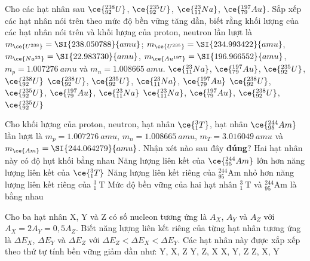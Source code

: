 \begin{ex}
	Cho các hạt nhân sau $\ce{_{92}^{238}U}$, $\ce{_{92}^{235}U}$, $\ce{_{11}^{23}Na}$, $\ce{_{79}^{197}Au}$. Sắp xếp các hạt nhân nói trên theo mức độ bền vững tăng dần, biết rằng khối lượng của các hạt nhân nói trên và khối lượng của proton, neutron lần lượt là $m_{\ce{U^{238}}}=\SI{238.050788}{amu}$; $m_{\ce{U^{235}}}=\SI{234.993422}{amu}$, $m_{\ce{Na^{23}}}=\SI{22.983730}{amu}$, $m_{\ce{Au^{197}}}=\SI{196.966552}{amu}$, $m_{p}=\SI{1.007276}{amu}$ và $m_{n}=\SI{1.008665}{amu}$.
	\choice
	{$\ce{_{11}^{23}Na}$, $\ce{_{79}^{197}Au}$, $\ce{_{92}^{235}U}$, $\ce{_{92}^{238}U}$}
	{$\ce{_{92}^{238}U}$, $\ce{_{92}^{235}U}$, $\ce{_{11}^{23}Na}$, $\ce{_{79}^{197}Au}$}
	{\True $\ce{_{92}^{238}U}$, $\ce{_{92}^{235}U}$, $\ce{_{79}^{197}Au}$, $\ce{_{11}^{23}Na}$}
	{$\ce{_{11}^{23}Na}$, $\ce{_{79}^{197}Au}$, $\ce{_{92}^{238}U}$, $\ce{_{92}^{235}U}$}
\end{ex}
\begin{ex}
	Cho khối lượng của proton, neutron, hạt nhân $\ce{_1^3T}$, hạt nhân $\ce{_{95}^{244}Am}$ lần lượt là $m_{p}=\SI{1.007276}{amu}$,  $m_{n}=\SI{1.008665}{amu}$, $m_{T}=\SI{3.016049}{amu}$ và $m_{\ce{Am}}=\SI{244.064279}{amu}$. Nhận xét nào sau đây \textbf{đúng}?
	\choice
	{Hai hạt nhân này có độ hụt khối bằng nhau}
	{\True Năng lượng liên kết của $\ce{_{95}^{244}Am}$ lớn hơn năng lượng liên kết của $\ce{_1^3T}$}
	{Năng lượng liên kết riêng của ${ }_{95}^{244} \mathrm{Am}$ nhỏ hơn năng lượng liên kết riêng của ${ }_1^3 \mathrm{~T}$}
	{Mức độ bền vững của hai hạt nhân ${ }_1^3 \mathrm{~T}$ và ${ }_{95}^{244} \mathrm{Am}$ là bằng nhau}
	\loigiai{}
\end{ex}
\begin{ex}
	Cho ba hạt nhân X, Y và Z có số nucleon tương ứng là $A_X$, $A_Y$ và $A_Z$ với $A_X=2 A_Y=0,5 A_Z$. Biết năng lượng liên kết riêng của từng hạt nhân tương ứng là $\Delta E_X$, $\Delta E_Y$ và $\Delta E_Z$ với $\Delta E_Z<\Delta E_X<\Delta E_Y$. Các hạt nhân này được xắp xếp theo thứ tự tính bền vững giảm dần như:
	\choice
	{\True Y, X, Z}
	{Y, Z, X}
	{X, Y, Z}
	{Z, X, Y}
	\loigiai{}
\end{ex}
